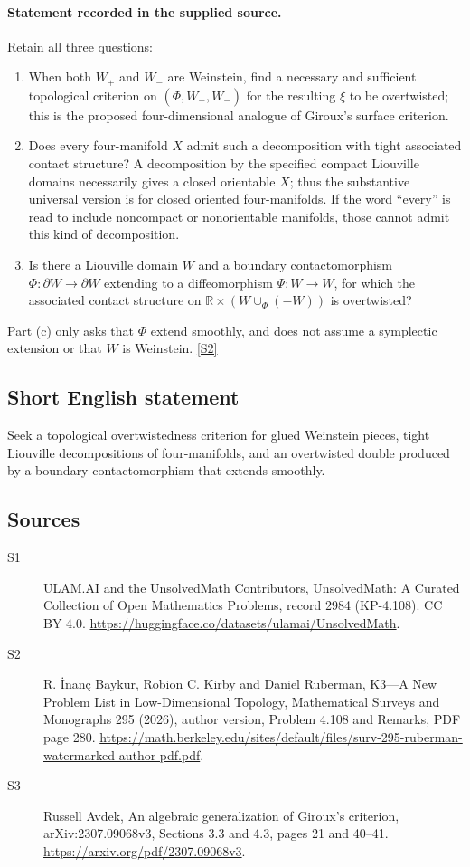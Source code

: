 \documentclass[11pt]{article}
\newcommand{\sref}[2]{\hyperlink{source:#1:#2}{[S#2]}}
\begin{document}
\paragraph{Statement recorded in the supplied source.}
Retain all three questions:
\begin{enumerate}
\item[(a)] When both $W_+$ and $W_-$ are Weinstein, find a necessary and sufficient topological criterion on $(\Phi,W_+,W_-)$ for the resulting $\xi$ to be overtwisted; this is the proposed four-dimensional analogue of Giroux's surface criterion.
\item[(b)] Does every four-manifold $X$ admit such a decomposition with tight associated contact structure? A decomposition by the specified compact Liouville domains necessarily gives a closed orientable $X$; thus the substantive universal version is for closed oriented four-manifolds. If the word ``every'' is read to include noncompact or nonorientable manifolds, those cannot admit this kind of decomposition.
\item[(c)] Is there a Liouville domain $W$ and a boundary contactomorphism $\Phi:\partial W\to\partial W$ extending to a diffeomorphism $\Psi:W\to W$, for which the associated contact structure on $\mathbb R\times(W\cup_\Phi(-W))$ is overtwisted?
\end{enumerate}
Part (c) only asks that $\Phi$ extend smoothly, and does not assume a symplectic extension or that $W$ is Weinstein. \sref{2984}{2}
\subsection{Short English statement}
Seek a topological overtwistedness criterion for glued Weinstein pieces, tight Liouville decompositions of four-manifolds, and an overtwisted double produced by a boundary contactomorphism that extends smoothly.
\subsection{Sources}
\begin{description}
\item[\hypertarget{source:2984:1}{S1}] ULAM.AI and the UnsolvedMath Contributors, UnsolvedMath: A Curated Collection of Open Mathematics Problems, record 2984 (KP-4.108). CC BY 4.0. \url{https://huggingface.co/datasets/ulamai/UnsolvedMath}.
\item[\hypertarget{source:2984:2}{S2}] R. İnanç Baykur, Robion C. Kirby and Daniel Ruberman, K3—A New Problem List in Low-Dimensional Topology, Mathematical Surveys and Monographs 295 (2026), author version, Problem 4.108 and Remarks, PDF page 280. \url{https://math.berkeley.edu/sites/default/files/surv-295-ruberman-watermarked-author-pdf.pdf}.
\item[\hypertarget{source:2984:3}{S3}] Russell Avdek, An algebraic generalization of Giroux’s criterion, arXiv:2307.09068v3, Sections 3.3 and 4.3, pages 21 and 40--41. \url{https://arxiv.org/pdf/2307.09068v3}.
\end{description}
\label{end:2984}
\end{document}
